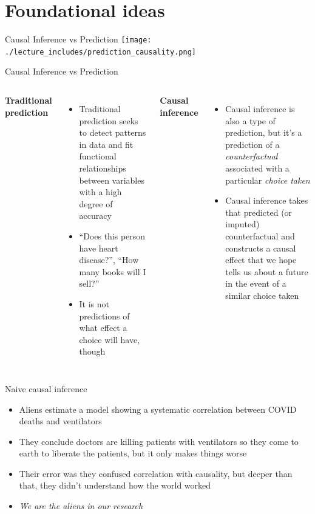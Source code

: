 \documentclass{beamer}
\begin{document}
\section{Foundational ideas}




\begin{frame}{Causal Inference vs Prediction}
  \centering
  \texttt{[image: ./lecture\_includes/prediction\_causality.png]}
\end{frame}

\begin{frame}{Causal Inference vs Prediction}

  \begin{columns}
    \centering
    \textbf{Traditional prediction}
    \begin{itemize}
      \item Traditional prediction seeks to detect patterns in data and fit functional relationships between variables with a high degree of accuracy
      \item ``Does this person have heart disease?'', ``How many books will I sell?''
      \item It is not predictions of what effect a choice will have, though
    \end{itemize}
    \centering
    \textbf{Causal inference}
    \begin{itemize}
      \item Causal inference is also a type of prediction, but it's a prediction of a \emph{counterfactual} associated with a particular \emph{choice taken}
      \item Causal inference takes that predicted (or imputed) counterfactual and constructs a causal effect that we hope tells us about a future in the event of a similar choice taken
    \end{itemize}
  \end{columns}
\end{frame}



\begin{frame}{Naive causal inference}

  \begin{itemize}
    \item Aliens estimate a model showing a systematic correlation between COVID deaths and ventilators
    \item They conclude doctors are killing patients with ventilators so they come to earth to liberate the patients, but it only makes things worse
    \item Their error was they confused correlation with causality, but deeper than that, they didn't understand how the world worked
    \item \emph{We are the aliens in our research}
  \end{itemize}

\end{frame}
\end{document}
